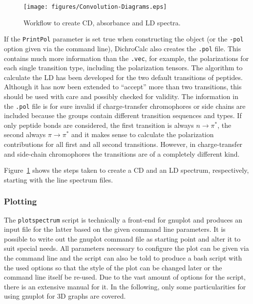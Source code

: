 \documentclass[11pt, letterpaper]{article}
\begin{document}
\begin{figure}[t]
\centering
\texttt{[image: figures/Convolution-Diagrams.eps]}
\caption{Workflow to create CD, absorbance and LD spectra.}
\label{Fig:CDandLD}
\end{figure}

If the \verb'PrintPol' parameter is set true when constructing the object (or the \verb'-pol' option given via the command line), DichroCalc also creates the \verb'.pol' file. This contains much more information than the \verb'.vec', for example, the polarizations for each single transition type, including the polarization tensors. The algorithm to calculate the LD has been developed for the two default transitions of peptides. Although it has now been extended to ``accept'' more than two transitions, this should be used with care and possibly checked for validity. The information in the \verb'.pol' file is for sure invalid if charge-transfer chromophores or side chains are included because the groups contain different transition sequences and types. If only peptide bonds are considered, the first transition is always $n\rightarrow\pi^*$, the second always $\pi\rightarrow\pi^*$ and it makes sense to calculate the polarization contributions for all first and all second transitions. However, in charge-transfer and side-chain chromophores the transitions are of a completely different kind.

\enlargethispage{1em}

Figure~\ref{Fig:CDandLD} shows the steps taken to create a CD and an LD spectrum, respectively, starting with the line spectrum files. 




\subsubsection{Plotting}

The \verb'plotspectrum' script is technically a front-end for gnuplot and produces an input file for the latter based on the given command line parameters. It is possible to write out the gnuplot command file as starting point and alter it to suit special needs. All parameters necessary to configure the plot can be given via the command line and the script can also be told to produce a bash script with the used options so that the style of the plot can be changed later or the command line itself be re-used. Due to the vast amount of options for the script, there is an extensive manual for it. In the following, only some particularities for using gnuplot for 3D graphs are covered.
\end{document}
